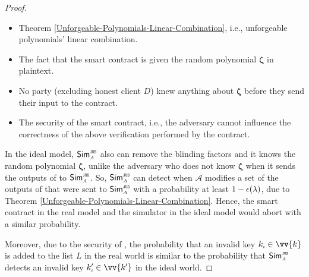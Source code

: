 \begin{proof}
\begin{itemize}
\item Theorem \ref{Unforgeable-Polynomials-Linear-Combination}, i.e., unforgeable polynomials’ linear combination.

\item  The fact that the smart contract is given the random polynomial $\bm \zeta$ in plaintext. 

\item No party (excluding honest client $D$) knew anything about $\bm \zeta$ before they send their input to the contract. 
\item The security of the smart contract, i.e., the adversary cannot influence the correctness of the above verification performed by the contract. 
\end{itemize}









In the ideal model, $\mathsf{Sim}^{\scriptscriptstyle \mathtt{JUS}}_{\scriptscriptstyle A}$ also can remove the blinding factors and it knows the random polynomial $ {\bm \zeta}$, unlike the adversary who does not know $ {\bm \zeta}$ when it sends the outputs of \vopr to $\mathsf{Sim}^{\scriptscriptstyle \mathtt{JUS}}_{\scriptscriptstyle A}$. So, $\mathsf{Sim}^{\scriptscriptstyle \mathtt{JUS}}_{\scriptscriptstyle A}$ can detect when $\mathcal{A}$ modifies a set of the outputs of \vopr that were sent to  $\mathsf{Sim}^{\scriptscriptstyle \mathtt{JUS}}_{\scriptscriptstyle A}$ with a probability at least $1-\epsilon(\lambda)$,  due to Theorem \ref{Unforgeable-Polynomials-Linear-Combination}. Hence, the smart contract in the real model and the simulator in the ideal model would abort with a similar probability. 

Moreover, due to the security of \zspaa, the probability that an invalid key $k_{\st i}\in \vv{k}$ is added to the list $  L$ in the real world is similar to the probability that  $\mathsf{Sim}^{\scriptscriptstyle \mathtt{JUS}}_{\scriptscriptstyle A}$ detects an invalid key $  k'_{\st i}\in \vv{k'}$ in the ideal world. 



\end{proof}

